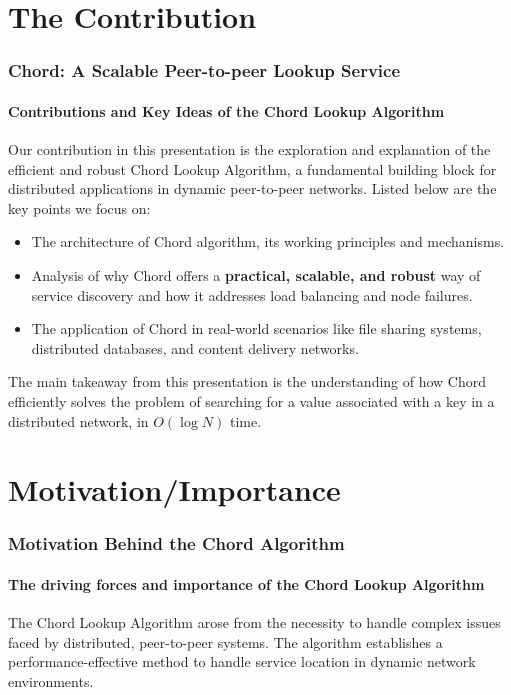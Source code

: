\documentclass[11pt]{beamer}              %
\begin{document}
\section{The Contribution}
\begin{frame}
\frametitle{Chord: A Scalable Peer-to-peer Lookup Service}
\framesubtitle{Contributions and Key Ideas of the Chord Lookup Algorithm}

Our contribution in this presentation is the exploration and explanation of the efficient and robust Chord Lookup Algorithm,
a fundamental building block for distributed applications in dynamic peer-to-peer networks. Listed below are the key points we focus on:

\begin{itemize}
\item The architecture of Chord algorithm, its working principles and mechanisms.
\item Analysis of why Chord offers a \textbf{practical, scalable, and robust} way of service discovery and how it addresses load balancing and node failures.
\item The application of Chord in real-world scenarios like file sharing systems, distributed databases, and content delivery networks.
\end{itemize}

The main takeaway from this presentation is the understanding of how Chord efficiently solves the problem of searching for a value associated with a key in a distributed network, in $O(\log N)$ time.

\end{frame}



\section{Motivation/Importance}

\begin{frame}
\frametitle{Motivation Behind the Chord Algorithm}
\framesubtitle{The driving forces and importance of the Chord Lookup Algorithm}

The Chord Lookup Algorithm arose from the necessity to handle complex issues faced by distributed, peer-to-peer systems. The algorithm establishes a performance-effective method to handle service location in dynamic network environments.

\end{frame}
\end{document}
